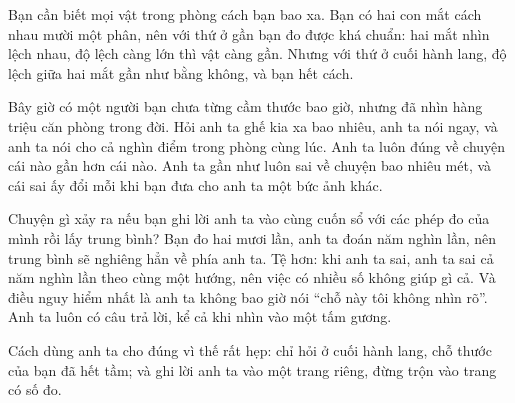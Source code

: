 \documentclass[../../deep_learning.tex]{subfiles}
\begin{document}
\begin{dongian}
Bạn cần biết mọi vật trong phòng cách bạn bao xa. Bạn có hai con mắt cách nhau mười một phân, nên với thứ ở gần bạn đo được khá chuẩn: hai mắt nhìn lệch nhau, độ lệch càng lớn thì vật càng gần. Nhưng với thứ ở cuối hành lang, độ lệch giữa hai mắt gần như bằng không, và bạn hết cách.

Bây giờ có một người bạn chưa từng cầm thước bao giờ, nhưng đã nhìn hàng triệu căn phòng trong đời. Hỏi anh ta ghế kia xa bao nhiêu, anh ta nói ngay, và anh ta nói cho cả nghìn điểm trong phòng cùng lúc. Anh ta luôn đúng về chuyện cái nào gần hơn cái nào. Anh ta gần như luôn sai về chuyện bao nhiêu mét, và cái sai ấy đổi mỗi khi bạn đưa cho anh ta một bức ảnh khác.

Chuyện gì xảy ra nếu bạn ghi lời anh ta vào cùng cuốn sổ với các phép đo của mình rồi lấy trung bình? Bạn đo hai mươi lần, anh ta đoán năm nghìn lần, nên trung bình sẽ nghiêng hẳn về phía anh ta. Tệ hơn: khi anh ta sai, anh ta sai cả năm nghìn lần theo cùng một hướng, nên việc có nhiều số không giúp gì cả. Và điều nguy hiểm nhất là anh ta không bao giờ nói ``chỗ này tôi không nhìn rõ''. Anh ta luôn có câu trả lời, kể cả khi nhìn vào một tấm gương.

Cách dùng anh ta cho đúng vì thế rất hẹp: chỉ hỏi ở cuối hành lang, chỗ thước của bạn đã hết tầm; và ghi lời anh ta vào một trang riêng, đừng trộn vào trang có số đo.

\end{dongian}
\end{document}
